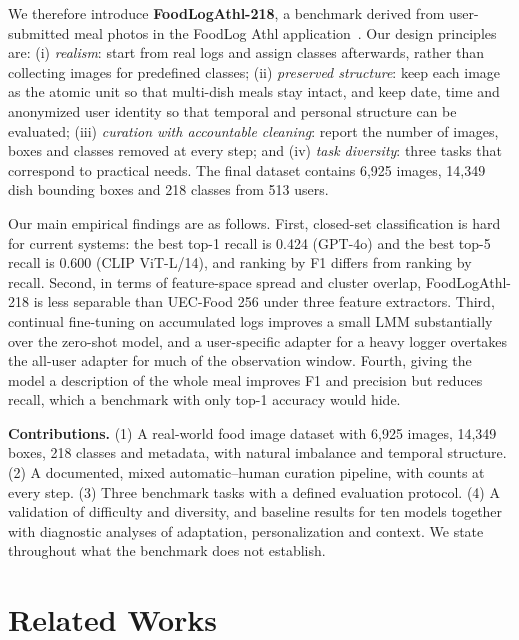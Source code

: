 \documentclass[sigconf, nonacm]{acmart}
\begin{document}
We therefore introduce \textbf{FoodLogAthl-218}, a benchmark derived from user-submitted meal photos in the FoodLog Athl application~\cite{nakamoto2022foodlog}. Our design principles are: (i) \emph{realism}: start from real logs and assign classes afterwards, rather than collecting images for predefined classes; (ii) \emph{preserved structure}: keep each image as the atomic unit so that multi-dish meals stay intact, and keep date, time and anonymized user identity so that temporal and personal structure can be evaluated; (iii) \emph{curation with accountable cleaning}: report the number of images, boxes and classes removed at every step; and (iv) \emph{task diversity}: three tasks that correspond to practical needs. The final dataset contains 6,925 images, 14,349 dish bounding boxes and 218 classes from 513 users.

Our main empirical findings are as follows. First, closed-set classification is hard for current systems: the best top-1 recall is 0.424 (GPT-4o) and the best top-5 recall is 0.600 (CLIP ViT-L/14), and ranking by F1 differs from ranking by recall. Second, in terms of feature-space spread and cluster overlap, FoodLogAthl-218 is less separable than UEC-Food 256 under three feature extractors. Third, continual fine-tuning on accumulated logs improves a small LMM substantially over the zero-shot model, and a user-specific adapter for a heavy logger overtakes the all-user adapter for much of the observation window. Fourth, giving the model a description of the whole meal improves F1 and precision but reduces recall, which a benchmark with only top-1 accuracy would hide.

\noindent\textbf{Contributions.} (1) A real-world food image dataset with 6,925 images, 14,349 boxes, 218 classes and metadata, with natural imbalance and temporal structure. (2) A documented, mixed automatic--human curation pipeline, with counts at every step. (3) Three benchmark tasks with a defined evaluation protocol. (4) A validation of difficulty and diversity, and baseline results for ten models together with diagnostic analyses of adaptation, personalization and context. We state throughout what the benchmark does not establish.

\section{Related Works}
\end{document}
